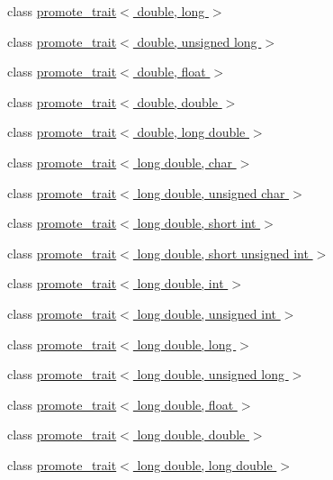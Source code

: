 \begin{DoxyCompactItemize}
\item 
class \hyperlink{classpromote__trait_3_01double_00_01long_01_4}{promote\+\_\+trait$<$ double, long $>$}
\item 
class \hyperlink{classpromote__trait_3_01double_00_01unsigned_01long_01_4}{promote\+\_\+trait$<$ double, unsigned long $>$}
\item 
class \hyperlink{classpromote__trait_3_01double_00_01float_01_4}{promote\+\_\+trait$<$ double, float $>$}
\item 
class \hyperlink{classpromote__trait_3_01double_00_01double_01_4}{promote\+\_\+trait$<$ double, double $>$}
\item 
class \hyperlink{classpromote__trait_3_01double_00_01long_01double_01_4}{promote\+\_\+trait$<$ double, long double $>$}
\item 
class \hyperlink{classpromote__trait_3_01long_01double_00_01char_01_4}{promote\+\_\+trait$<$ long double, char $>$}
\item 
class \hyperlink{classpromote__trait_3_01long_01double_00_01unsigned_01char_01_4}{promote\+\_\+trait$<$ long double, unsigned char $>$}
\item 
class \hyperlink{classpromote__trait_3_01long_01double_00_01short_01int_01_4}{promote\+\_\+trait$<$ long double, short int $>$}
\item 
class \hyperlink{classpromote__trait_3_01long_01double_00_01short_01unsigned_01int_01_4}{promote\+\_\+trait$<$ long double, short unsigned int $>$}
\item 
class \hyperlink{classpromote__trait_3_01long_01double_00_01int_01_4}{promote\+\_\+trait$<$ long double, int $>$}
\item 
class \hyperlink{classpromote__trait_3_01long_01double_00_01unsigned_01int_01_4}{promote\+\_\+trait$<$ long double, unsigned int $>$}
\item 
class \hyperlink{classpromote__trait_3_01long_01double_00_01long_01_4}{promote\+\_\+trait$<$ long double, long $>$}
\item 
class \hyperlink{classpromote__trait_3_01long_01double_00_01unsigned_01long_01_4}{promote\+\_\+trait$<$ long double, unsigned long $>$}
\item 
class \hyperlink{classpromote__trait_3_01long_01double_00_01float_01_4}{promote\+\_\+trait$<$ long double, float $>$}
\item 
class \hyperlink{classpromote__trait_3_01long_01double_00_01double_01_4}{promote\+\_\+trait$<$ long double, double $>$}
\item 
class \hyperlink{classpromote__trait_3_01long_01double_00_01long_01double_01_4}{promote\+\_\+trait$<$ long double, long double $>$}
\end{DoxyCompactItemize}

